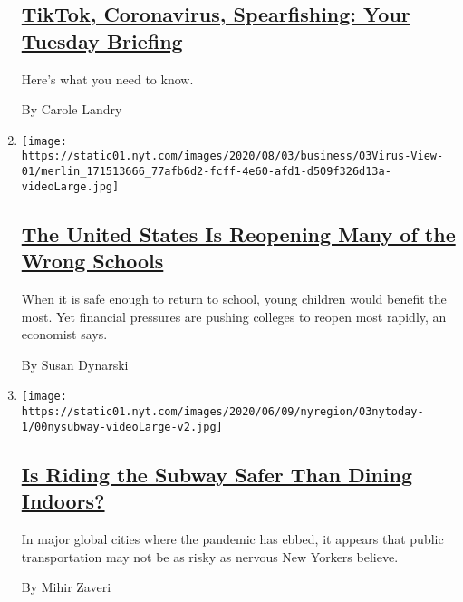\begin{enumerate}
  \hypertarget{tiktok-coronavirus-spearfishing-your-tuesday-briefing}{%
  \subsection{\texorpdfstring{\href{/2020/08/03/briefing/coronavirus-tiktok-afghanistan-australia.html}{TikTok,
  Coronavirus, Spearfishing: Your Tuesday
  Briefing}}{TikTok, Coronavirus, Spearfishing: Your Tuesday Briefing}}\label{tiktok-coronavirus-spearfishing-your-tuesday-briefing}}

  Here's what you need to know.

  By Carole Landry
\item
  \texttt{[image: https://static01.nyt.com/images/2020/08/03/business/03Virus-View-01/merlin\_171513666\_77afb6d2-fcff-4e60-afd1-d509f326d13a-videoLarge.jpg]}

  \hypertarget{the-united-states-is-reopening-many-of-the-wrong-schools}{%
  \subsection{\texorpdfstring{\href{/2020/08/03/business/how-schools-reopen.html}{The
  United States Is Reopening Many of the Wrong
  Schools}}{The United States Is Reopening Many of the Wrong Schools}}\label{the-united-states-is-reopening-many-of-the-wrong-schools}}

  When it is safe enough to return to school, young children would
  benefit the most. Yet financial pressures are pushing colleges to
  reopen most rapidly, an economist says.

  By Susan Dynarski
\item
  \texttt{[image: https://static01.nyt.com/images/2020/06/09/nyregion/03nytoday-1/00nysubway-videoLarge-v2.jpg]}

  \hypertarget{is-riding-the-subway-safer-than-dining-indoors}{%
  \subsection{\texorpdfstring{\href{/2020/08/03/nyregion/nyc-subway-coronavirus.html}{Is
  Riding the Subway Safer Than Dining
  Indoors?}}{Is Riding the Subway Safer Than Dining Indoors?}}\label{is-riding-the-subway-safer-than-dining-indoors}}

  In major global cities where the pandemic has ebbed, it appears that
  public transportation may not be as risky as nervous New Yorkers
  believe.

  By Mihir Zaveri
\end{enumerate}

